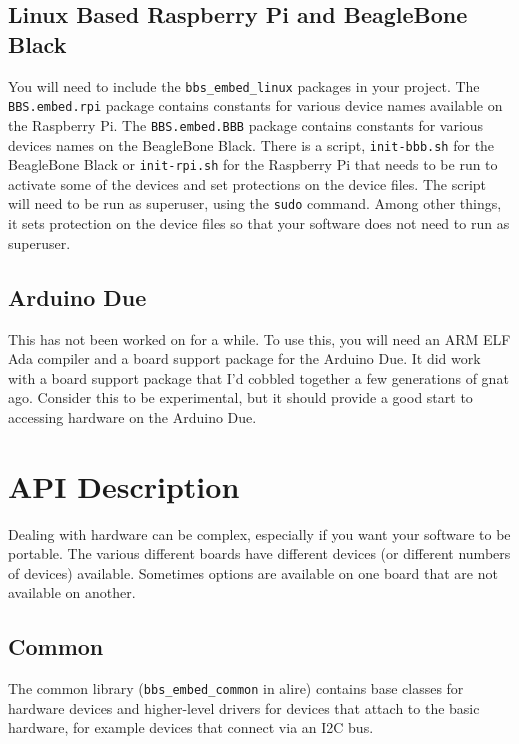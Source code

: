 \documentclass[10pt, openany]{book}
\newcommand{\package}[1]{\texttt{#1}}
\newcommand{\cli}[1]{\texttt{#1}}
\begin{document}
\section{Linux Based Raspberry Pi and BeagleBone Black}
You will need to include the \package{bbs\_embed\_linux} packages in your project.  The \package{BBS.embed.rpi} package contains constants for various device names available on the Raspberry Pi.  The \package{BBS.embed.BBB} package contains constants for various devices names on the BeagleBone Black.  There is a script, \package{init-bbb.sh} for the BeagleBone Black or \package{init-rpi.sh} for the Raspberry Pi that needs to be run to activate some of the devices and set protections on the device files.  The script will need to be run as superuser, using the \cli{sudo} command.  Among other things, it sets protection on the device files so that your software does not need to run as superuser.

\section{Arduino Due}
This has not been worked on for a while.  To use this, you will need an ARM ELF Ada compiler and a board support package for the Arduino Due.  It did work with a board support package that I'd cobbled together a few generations of gnat ago.  Consider this to be experimental, but it should provide a good start to accessing hardware on the Arduino Due.

\chapter{API Description}
Dealing with hardware can be complex, especially if you want your software to be portable.  The various different boards have different devices (or different numbers of devices) available.  Sometimes options are available on one board that are not available on another.

\section{Common}
The common library (\package{bbs\_embed\_common} in alire) contains base classes for hardware devices and higher-level drivers for devices that attach to the basic hardware, for example devices that connect via an I2C bus.
\end{document}
